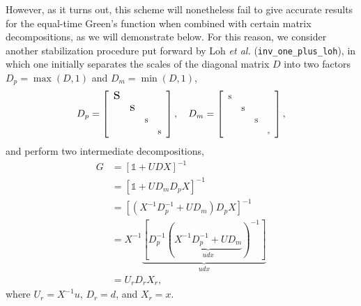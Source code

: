 \documentclass[submission, Phys]{SciPost}
\newcommand{\stiny}{\scalebox{0.5}{s}}
\newcommand{\ssmall}{\scalebox{0.9}{s}}
\newcommand{\smedium}{\scalebox{1.3}{s}}
\newcommand{\slarge}{\scalebox{1.7}{s}}
\newcommand{\Dp}{\left[
	\begin{array}{cccc}
		\slarge &  &  &  \\
		& \smedium &  &  \\
		&  & \ssmall &  \\
		&  &  & \ssmall \\
	\end{array}
	\right]}
\newcommand{\Dm}{\left[
	\begin{array}{cccc}
		\ssmall &  &  &  \\
		& \ssmall &  &  \\
		&  & \ssmall &  \\
		&  &  & \stiny \\
	\end{array}
	\right]}
\begin{document}
However, as it turns out, this scheme will nonetheless fail to give accurate results for the equal-time Green's function when combined with certain matrix decompositions, as we will demonstrate below. For this reason, we consider another stabilization procedure put forward by Loh \textit{et al.} \cite{Loh2005, Loh1989} (\texttt{inv\_one\_plus\_loh}), in which one initially separates the scales of the diagonal matrix $D$ into two factors $D_p = \max(D, 1)$ and $D_m = \min(D, 1)$,
\begin{align}
D_p = \Dp, \quad D_m = \Dm,
\end{align}
and perform two intermediate decompositions,
\begin{align}
	G &= [\mathbb{1} + UDX]^{-1} \nonumber\\
	&= [\mathbb{1} + UD_mD_pX]^{-1} \nonumber\\
	&= [(X^{-1} D_p^{-1} + U D_m) D_p X]^{-1} \label{eq:inversion_loh} \\
	&= X^{-1} \underbrace{[D_p^{-1} (\underbrace{X^{-1} D_p^{-1} + UD_m}_{udx})^{-1}]}_{udx} \nonumber \\
	&= U_r D_r X_r, \nonumber
\end{align}
where $U_r = X^{-1}u$, $D_r = d$, and $X_r = x$.
\end{document}
